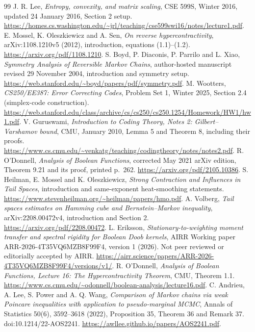\documentclass[11pt]{article}
\begin{document}
\begin{thebibliography}{99}
 J. R. Lee, \emph{Entropy, convexity, and matrix scaling}, CSE 599S, Winter 2016, updated 24 January 2016, Section 2 setup. \url{https://homes.cs.washington.edu/~jrl/teaching/cse599swi16/notes/lecture1.pdf}.
 E. Mossel, K. Oleszkiewicz and A. Sen, \emph{On reverse hypercontractivity}, arXiv:1108.1210v5 (2012), introduction, equations (1.1)--(1.2). \url{https://arxiv.org/pdf/1108.1210}.
 S. Boyd, P. Diaconis, P. Parrilo and L. Xiao, \emph{Symmetry Analysis of Reversible Markov Chains}, author-hosted manuscript revised 29 November 2004, introduction and symmetry setup. \url{https://web.stanford.edu/~boyd/papers/pdf/symmetry.pdf}.
 M. Wootters, \emph{CS250/EE387: Error Correcting Codes}, Problem Set 1, Winter 2025, Section 2.4 (simplex-code construction). \url{https://web.stanford.edu/class/archive/cs/cs250/cs250.1254/Homework/HW1/hw1.pdf}.
 V. Guruswami, \emph{Introduction to Coding Theory, Notes 2: Gilbert--Varshamov bound}, CMU, January 2010, Lemma 5 and Theorem 8, including their proofs. \url{https://www.cs.cmu.edu/~venkatg/teaching/codingtheory/notes/notes2.pdf}.
 R. O'Donnell, \emph{Analysis of Boolean Functions}, corrected May 2021 arXiv edition, Theorem 9.21 and its proof, printed p.~262. \url{https://arxiv.org/pdf/2105.10386}.
 S. Heilman, E. Mossel and K. Oleszkiewicz, \emph{Strong Contraction and Influences in Tail Spaces}, introduction and same-exponent heat-smoothing statements. \url{https://www.stevenheilman.org/~heilman/papers/hmo.pdf}.
 A. Volberg, \emph{Tail spaces estimates on Hamming cube and Bernstein--Markov inequality}, arXiv:2208.00472v4, introduction and Section 2. \url{https://arxiv.org/pdf/2208.00472}.
 L. Eriksson, \emph{Stationary-to-weighting moment transfer and spectral rigidity for Boolean Doob kernels}, AIRR Working paper ARR-2026-4T35VQ6MZB8F99F4, version 1 (2026). Not peer reviewed or editorially accepted by AIRR. \url{https://airr.science/papers/ARR-2026-4T35VQ6MZB8F99F4/versions/v1/}.
 R. O'Donnell, \emph{Analysis of Boolean Functions, Lecture 16: The Hypercontractivity Theorem}, CMU, Theorem 1.1. \url{https://www.cs.cmu.edu/~odonnell/boolean-analysis/lecture16.pdf}.
 C. Andrieu, A. Lee, S. Power and A. Q. Wang, \emph{Comparison of Markov chains via weak Poincare inequalities with application to pseudo-marginal MCMC}, Annals of Statistics 50(6), 3592--3618 (2022), Proposition 35, Theorem 36 and Remark 37. doi:10.1214/22-AOS2241. \url{https://awllee.github.io/papers/AOS2241.pdf}.

\end{thebibliography}
\end{document}
